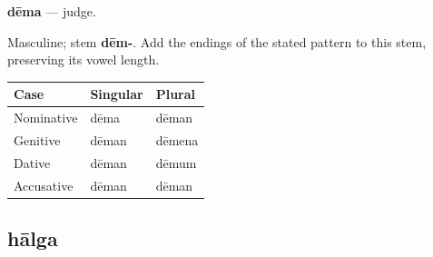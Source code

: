 \par\begin{minipage}{\linewidth}\raggedright
\textbf{dēma} — judge.

Masculine; stem \textbf{dēm-}. Add the endings of the stated pattern to this stem, preserving its vowel length.

\par\begingroup
\fontsize{10.5}{13.2}\selectfont
\setlength{\LTleft}{0pt}\setlength{\LTright}{\fill}
\noindent
\begin{tabular}{@{}>{\raggedright\arraybackslash}p{39.46mm}>{\raggedright\arraybackslash}p{39.46mm}>{\raggedright\arraybackslash}p{39.46mm}@{}}
\toprule
\textbf{Case} & \textbf{Singular} & \textbf{Plural} \\
\midrule
Nominative & dēma & dēman \\
Genitive & dēman & dēmena \\
Dative & dēman & dēmum \\
Accusative & dēman & dēman \\
\bottomrule
\end{tabular}
\par\endgroup

\end{minipage}\par
{}
\subsection*{hālga}

